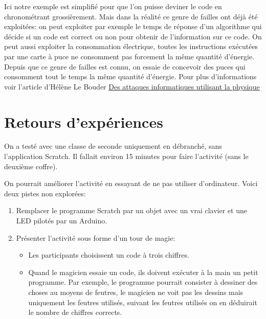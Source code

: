 \documentclass[a4paper]{article}
\newcommand{\guill}[1]{\og{}#1\fg{}}
\begin{document}
\guill{Ici notre exemple est simplifié pour que l'on puisse deviner le code en chronométrant grossièrement.
Mais dans la réalité ce genre de failles ont déjà été exploitées: on peut exploiter par exemple le temps de réponse d'un algorithme qui décide si un code est correct ou non pour obtenir de l'information sur ce code. On peut aussi exploiter la consommation électrique, toutes les instructions exécutées par une carte à puce ne consomment pas forcement la même quantité d'énergie.
Depuis que ce genre de failles est connu, on essaie de concevoir des puces qui consomment tout le temps la même quantité d'énergie. Pour plus d'informations voir l'article d'Hélène Le Bouder \href{https://interstices.info/jcms/p_91127/des-attaques-informatiques-utilisant-la-physique}{Des attaques informatiques utilisant la physique}
}

\section{Retours d'expériences}

On a testé avec une classe de seconde uniquement en débranché, sans l'application Scratch. Il fallait environ 15 minutes pour faire l'activité (sans le deuxième coffre).

On pourrait améliorer l'activité en essayant de ne pas utiliser d'ordinateur. Voici deux pistes non explorées:
\begin{enumerate}
\item Remplacer le programme Scratch par un objet avec un vrai clavier et une LED pilotés par un Arduino.
\item Présenter l'activité sous forme d'un tour de magie:
 \begin{itemize}
  \item Les participants choisissent un code à trois chiffres.
  \item Quand le magicien essaie un code, ils doivent exécuter à la main un petit programme.
Par exemple, le programme pourrait consister à dessiner des choses au moyens de feutres, le magicien ne voit pas les dessins mais uniquement les feutres utilisés, suivant les feutres utilisés on en déduirait le nombre de chiffres corrects.
 \end{itemize} 
\end{enumerate}

\end{document}
